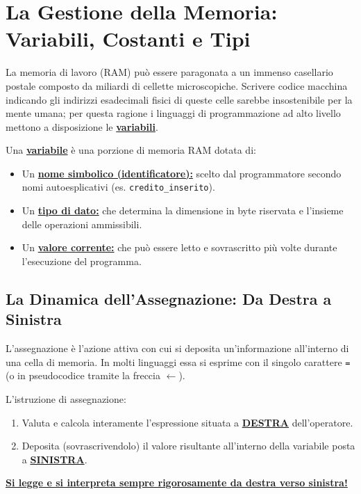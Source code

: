 \section{La Gestione della Memoria: Variabili, Costanti e Tipi}

La memoria di lavoro (RAM) può essere paragonata a un immenso casellario postale composto da miliardi di cellette microscopiche. Scrivere codice macchina indicando gli indirizzi esadecimali fisici di queste celle sarebbe insostenibile per la mente umana; per questa ragione i linguaggi di programmazione ad alto livello mettono a disposizione le \textbf{\underline{variabili}}.

\begin{concetto}
Una \textbf{\underline{variabile}} è una porzione di memoria RAM dotata di:
\begin{itemize}
  \item Un \textbf{\underline{nome simbolico (identificatore):}} scelto dal programmatore secondo nomi autoesplicativi (es. \texttt{credito\_inserito}).
  \item Un \textbf{\underline{tipo di dato:}} che determina la dimensione in byte riservata e l'insieme delle operazioni ammissibili.
  \item Un \textbf{\underline{valore corrente:}} che può essere letto e sovrascritto più volte durante l'esecuzione del programma.
\end{itemize}
\end{concetto}

\subsection{La Dinamica dell'Assegnazione: Da Destra a Sinistra}

L'assegnazione è l'azione attiva con cui si deposita un'informazione all'interno di una cella di memoria. In molti linguaggi essa si esprime con il singolo carattere \texttt{=} (o in pseudocodice tramite la freccia $\leftarrow$).

\begin{concetto}
L'istruzione di assegnazione:
\begin{enumerate}
  \item Valuta e calcola interamente l'espressione situata a \textbf{\underline{DESTRA}} dell'operatore.
  \item Deposita (sovrascrivendolo) il valore risultante all'interno della variabile posta a \textbf{\underline{SINISTRA}}.
\end{enumerate}
\textbf{\underline{Si legge e si interpreta sempre rigorosamente da destra verso sinistra!}}
\end{concetto}

